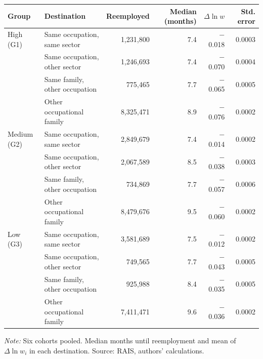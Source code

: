 {\footnotesize
\begin{threeparttable}
\begin{tabular}{llrrrr}
\toprule
Group & Destination & Reemployed & Median (months) & $\Delta \ln w$ & Std. error \\
\midrule
High (G1) & Same occupation, same sector & 1,231,800 & 7.4 & $-$0.018 & 0.0003 \\
 & Same occupation, other sector & 1,246,693 & 7.4 & $-$0.070 & 0.0004 \\
 & Same family, other occupation & 775,465 & 7.7 & $-$0.065 & 0.0005 \\
 & Other occupational family & 8,325,471 & 8.9 & $-$0.076 & 0.0002 \\
\addlinespace[3pt]
Medium (G2) & Same occupation, same sector & 2,849,679 & 7.4 & $-$0.014 & 0.0002 \\
 & Same occupation, other sector & 2,067,589 & 8.5 & $-$0.038 & 0.0003 \\
 & Same family, other occupation & 734,869 & 7.7 & $-$0.057 & 0.0006 \\
 & Other occupational family & 8,479,676 & 9.5 & $-$0.060 & 0.0002 \\
\addlinespace[3pt]
Low (G3) & Same occupation, same sector & 3,581,689 & 7.5 & $-$0.012 & 0.0002 \\
 & Same occupation, other sector & 749,565 & 7.7 & $-$0.043 & 0.0005 \\
 & Same family, other occupation & 925,988 & 8.4 & $-$0.035 & 0.0005 \\
 & Other occupational family & 7,411,471 & 9.6 & $-$0.036 & 0.0002 \\
\bottomrule
\end{tabular}
\begin{tablenotes}[flushleft]\footnotesize
\item \textit{Note:} Six cohorts pooled. Median months until reemployment and mean of $\Delta \ln w_i$ in each destination. Source: RAIS, authors' calculations.
\end{tablenotes}
\end{threeparttable}
}

